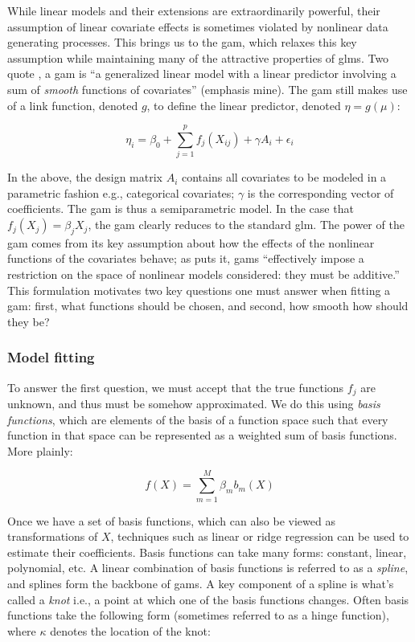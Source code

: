 \documentclass{report}
\begin{document}
While linear models and their extensions are extraordinarily powerful, their assumption of linear covariate effects is sometimes violated by nonlinear data generating processes. This brings us to the \gls{gam}, which relaxes this key assumption while maintaining many of the attractive properties of \glspl{glm}. Two quote \cite[Chapter~4.1]{wood_generalized_2017}, a \gls{gam} is ``a generalized linear model with a linear predictor involving a sum of \textit{smooth} functions of covariates'' (emphasis mine). The \gls{gam} still makes use of a link function, denoted $g$, to define the linear predictor, denoted $\eta = g(\mu)$:

\begin{equation}\label{eq:glm-gam-model-form}
    \eta_i = \beta_0 + \sum_{j=1}^p f_j(X_{ij}) + \gamma A_i + \epsilon_i
\end{equation}

In the above, the design matrix $A_i$ contains all covariates to be modeled in a parametric fashion e.g., categorical covariates; $\gamma$ is the corresponding vector of coefficients. The \gls{gam} is thus a semiparametric model. In the case that $f_j(X_j) = \beta_j X_j$, the \gls{gam} clearly reduces to the standard \gls{glm}. The power of the \gls{gam} comes from its key assumption about how the effects of the nonlinear functions of the covariates behave; as \cite[Lecture~14]{molstad_sta_2022} puts it, \glspl{gam} ``effectively impose a restriction on the space of nonlinear models considered: they must be additive.'' This formulation motivates two key questions one must answer when fitting a \gls{gam}: first, what functions should be chosen, and second, how smooth how should they be?

\subsubsection{Model fitting}

To answer the first question, we must accept that the true functions $f_j$ are unknown, and thus must be somehow approximated. We do this using \textit{basis functions}, which are elements of the basis of a function space such that every function in that space can be represented as a weighted sum of basis functions. More plainly:

\begin{equation}\label{eq:glm-gam-basis-functions}
    f(X) = \sum_{m=1}^M \beta_m b_m(X)
\end{equation}

Once we have a set of basis functions, which can also be viewed as transformations of $X$, techniques such as linear or ridge regression can be used to estimate their coefficients. Basis functions can take many forms: constant, linear, polynomial, etc. A linear combination of basis functions is referred to as a \textit{spline}, and splines form the backbone of \glspl{gam}. A key component of a spline is what's called a \textit{knot} i.e., a point at which one of the basis functions changes. Often basis functions take the following form (sometimes referred to as a hinge function), where $\kappa$ denotes the location of the knot:
\end{document}
